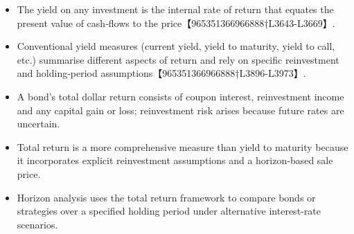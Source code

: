 \documentclass[
  letterpaper,
  DIV=11,
  numbers=noendperiod]{scrartcl}
\providecommand{\tightlist}{%
  \setlength{\itemsep}{0pt}\setlength{\parskip}{0pt}}
\begin{document}
\begin{itemize}
\tightlist
\item
  The yield on any investment is the internal rate of return that
  equates the present value of cash‑flows to the
  price【965351366966888†L3643-L3669】.
\item
  Conventional yield measures (current yield, yield to maturity, yield
  to call, etc.) summarise different aspects of return and rely on
  specific reinvestment and holding‑period
  assumptions【965351366966888†L3896-L3973】.
\item
  A bond's total dollar return consists of coupon interest, reinvestment
  income and any capital gain or loss; reinvestment risk arises because
  future rates are uncertain.
\item
  Total return is a more comprehensive measure than yield to maturity
  because it incorporates explicit reinvestment assumptions and a
  horizon‑based sale price.
\item
  Horizon analysis uses the total return framework to compare bonds or
  strategies over a specified holding period under alternative
  interest‑rate scenarios.
\end{itemize}
\end{document}

